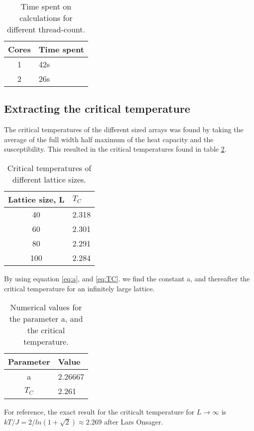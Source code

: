 \documentclass[../main.tex]{subfiles}
\begin{document}
\begin{table}[!h]
  \begin{center}
    \begin{tabular}{|c| l|}
      \hline
      Cores & Time spent\\
      \hline
      1 & 42s\\
      2 & 26s\\
      \hline
    \end{tabular}
    \caption{Time spent on calculations for different thread-count.}
    \label{tab:results-MPI}
  \end{center}
\end{table}
\FloatBarrier

\subsection{Extracting the critical temperature}
The critical temperatures of the different sized arrays was found by taking the average of the full width half maximum of the heat capacity and the susceptibility. This resulted in the critical temperatures found in table \ref{tab:results-TC-lattices}.
\begin{table}[!h]
  \begin{center}
    \begin{tabular}{|c| l|}
      \hline
      Lattice size, L & $T_C$ \\
      \hline
      40 & 2.318\\
      60 & 2.301\\
      80 & 2.291\\
      100 & 2.284\\
      \hline
    \end{tabular}
    \caption{Critical temperatures of different lattice sizes.}
    \label{tab:results-TC-lattices}
  \end{center}
\end{table}
\FloatBarrier
By using equation \eqref{eq:a}, and \eqref{eq:TC}. we find the constant a, and thereafter the critical temperature for an infinitely large lattice.

\begin{table}[!h]
  \begin{center}
    \begin{tabular}{|c| l|}
      \hline
      Parameter & Value \\
      \hline
      a & 2.26667\\
      $T_C$ & 2.261\\
      \hline
    \end{tabular}
    \caption{Numerical values for the parameter a, and the critical temperature.}
    \label{tab:results-a-and-TC}
  \end{center}
\end{table}
\FloatBarrier

For reference, the exact result for the criticalt temperature for $L \rightarrow \infty$ is $kT/J = 2/ln(1 +\sqrt{2}) \approx 2.269$ after Lars Onsager.\cite{larsonsager}
\end{document}
